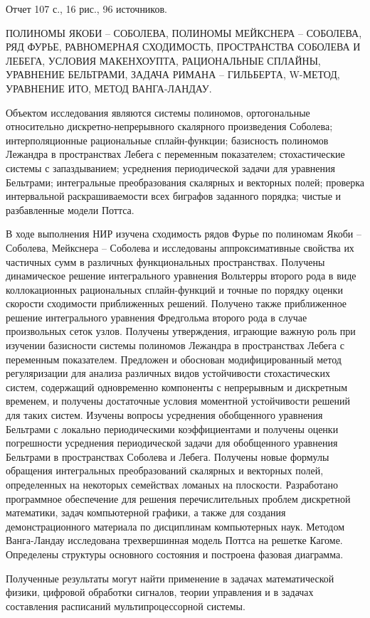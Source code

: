 \Referat %

Отчет 107 с., 16 рис.,  96 источников.

\MakeUppercase{полиномы Якоби -- Соболева, полиномы Мейкснера -- Соболева, ряд Фурье, равномерная сходимость, пространства Соболева и Лебега, условия Макенхоупта, рациональные сплайны, уравнение Бельтрами, задача Римана -- Гильберта, W-метод, уравнение Ито, метод Ванга-Ландау.
}

Объектом исследования являются системы полиномов, ортогональные относительно дискретно-непрерывного скалярного произведения Соболева; интерполяционные рациональные сплайн-функции;
базисность полиномов Лежандра в пространствах Лебега с переменным показателем;
стохастические системы с запаздыванием;
усреднения периодической задачи для уравнения Бельтрами;
интегральные преобразования скалярных и векторных полей;
проверка интервальной раскрашиваемости всех биграфов заданного порядка;
чистые и разбавленные модели Поттса.

В ходе выполнения НИР изучена сходимость рядов Фурье по полиномам Якоби -- Соболева, Мейкснера -- Соболева и исследованы аппроксимативные свойства их частичных сумм в различных функциональных пространствах. Получены динамическое решение интегрального уравнения Вольтерры второго рода в виде коллокационных рациональных сплайн-функций и точные по порядку оценки скорости сходимости приближенных решений. Получено также приближенное решение интегрального уравнения Фредгольма второго рода в случае произвольных сеток узлов.
Получены утверждения, играющие важную роль при изучении базисности системы полиномов Лежандра в пространствах Лебега с переменным показателем.
Предложен и обоснован модифицированный метод регуляризации для анализа различных видов устойчивости стохастических систем, содержащий одновременно компоненты с непрерывным и дискретным временем, и получены достаточные условия моментной устойчивости решений для таких систем.
Изучены вопросы усреднения обобщенного уравнения Бельтрами с локально периодическими коэффициентами и получены оценки погрешности усреднения периодической задачи для обобщенного уравнения Бельтрами в пространствах Соболева и Лебега.
Получены новые формулы обращения интегральных преобразований скалярных и векторных полей, определенных на некоторых семействах ломаных на плоскости.
Разработано программное обеспечение для решения перечислительных проблем дискретной математики, задач компьютерной графики, а также для создания демонстрационного материала по дисциплинам компьютерных наук.
Методом Ванга-Ландау исследована трехвершинная модель Поттса на решетке Кагоме.
Определены структуры основного состояния и построена фазовая диаграмма.

Полученные результаты могут найти применение в задачах математической физики, цифровой обработки сигналов, теории управления и в задачах составления расписаний мультипроцессорной системы.
